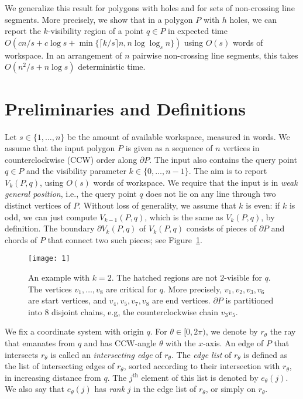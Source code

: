 \documentclass[11pt, a4paper]{article}
\begin{document}
We generalize this result for polygons with holes 
and for sets of non-crossing line segments.
More precisely, we show that in a polygon $P$
with $h$ holes, we can report the $k$-visibility
region of a point $q \in P$ in expected time 
$O(cn/s+c\log{s} + 
\min\{\lceil k/s \rceil n,n \log{\log_s{n}}\})$
using $O(s)$ words of workspace. In an
arrangement of $n$ pairwise non-crossing line
segments, this takes $O(n^2/s + n\log s)$ 
deterministic time.

\section{Preliminaries and Definitions}

Let $s \in \{1, \dots, n\}$ be the amount of available workspace,
measured in words.
We assume that the input polygon $P$ is given 
as a sequence of $n$ vertices in counterclockwise (CCW) 
order along $\partial P$.
The input also contains the query point $q\in P$ and
the visibility parameter $k \in \{0, \dots, n - 1\}$. The aim is to 
report $V_k(P,q)$, using $O(s)$ words 
of workspace. We require that the input is in \emph{weak 
general position}, i.e., the query point $q$ does not lie on any 
line through two distinct vertices of $P$. Without loss of generality, 
we assume that $k$ is even: if $k$ is odd, we 
can just compute $V_{k-1}(P,q)$, which is the same as
$V_k(P,q)$, by definition. The boundary $\partial V_k(P,q)$ of 
$V_k(P,q)$ consists of pieces of $\partial P$ and chords 
of $P$ that connect two such pieces; see Figure~\ref{fig:fig1}.

\begin{figure}
 \centering 
 \texttt{[image: 1]}
\caption{An example with $k=2$. 
The hatched regions are not $2$-visible for $q$.
The vertices $v_1, \dots, v_8$ are critical for $q$.
More precisely, $v_1, v_2, v_3, v_6$ are 
start vertices, and $v_4, v_5, v_7, v_8$ 
are end vertices. $\partial P$ is 
partitioned into $8$ disjoint chains, e.g, 
the counterclockwise chain $v_3v_5$.}
\label{fig:fig1}
\end{figure}


We fix a coordinate system with origin $q$.
For $\theta \in [0, 2\pi)$, we denote by $r_\theta$ the ray 
that emanates from $q$ and has CCW-angle $\theta$ with the 
$x$-axis. An edge of $P$ that intersects $r_\theta$ is called 
an \emph{intersecting edge} of $r_\theta$. The \emph{edge list} 
of $r_\theta$ is defined as the list of intersecting edges of 
$r_\theta$, sorted according to their intersection with $r_\theta$,
in increasing distance from $q$. The $j^\text{th}$ element of this 
list is denoted by $e_{\theta}(j)$. We also say that $e_{\theta}(j)$ has
\emph{rank} $j$ in the edge list of $r_\theta$, or simply on $r_\theta$.
\end{document}
